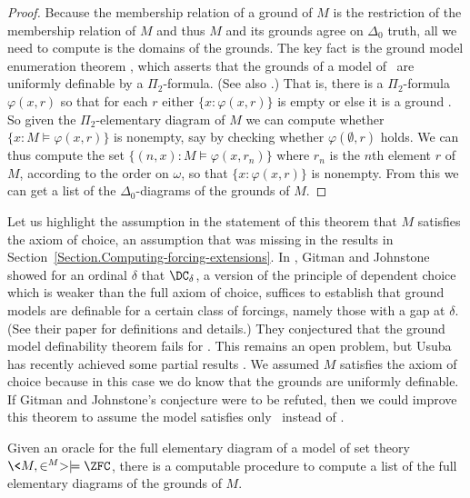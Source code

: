 \documentclass{amsart}
\begin{document}
 \begin{proof}
 Because the membership relation of a ground of $M$ is the restriction of the membership relation of $M$ and thus $M$ and its grounds agree on $\Delta_0$ truth, all we need to compute is the domains of the grounds.
 The key fact is the ground model enumeration theorem \cite{FuchsHamkinsReitz2015:Set-theoreticGeology}, which asserts that the grounds of a model of \ZFC\ are uniformly definable by a $\Pi_2$-formula. (See also \cite{BagariaHamkinsTsaprounisUsuba2016:SuperstrongAndOtherLargeCardinalsAreNeverLaverIndestructible}.) That is, there is a $\Pi_2$-formula $\varphi(x,r)$ so that for each $r$ either $\{ x : \varphi(x,r) \}$ is empty or else it is a ground \cite{FuchsHamkinsReitz2015:Set-theoreticGeology}.
 So given the $\Pi_2$-elementary diagram of $M$ we can compute whether $\{ x : M \models \varphi(x,r) \}$ is nonempty, say by checking whether $\varphi(\emptyset,r)$ holds. We can thus compute the set $\{ (n,x) : M \models \varphi(x,r_n) \}$ where $r_n$ is the $n$th element $r$ of $M$, according to the order on $\omega$, so that $\{ x : \varphi(x,r) \}$ is nonempty. From this we can get a list of the $\Delta_0$-diagrams of the grounds of $M$.
 \end{proof}
 
 Let us highlight the assumption in the statement of this theorem that $M$ satisfies the axiom of choice, an assumption that was missing in the results in Section~\ref{Section.Computing-forcing-extensions}. In \cite{gitmanjohnstone:groundmodels}, Gitman and Johnstone showed for an ordinal $\delta$ that $\DC_\delta$, a version of the principle of dependent choice which is weaker than the full axiom of choice, suffices to establish that ground models are definable for a certain class of forcings, namely those with a gap at $\delta$. (See their paper for definitions and details.) They conjectured that the ground model definability theorem fails for \ZF. This remains an open problem, but Usuba has recently achieved some partial results \cite{usuba2019}. We assumed $M$ satisfies the axiom of choice because in this case we do know that the grounds are uniformly definable. If Gitman and Johnstone's conjecture were to be refuted, then we could improve this theorem to assume the model satisfies only \ZF\ instead of \ZFC.
 
 \begin{corollary}\label{Corollary.Computing-grounds}
 Given an oracle for the full elementary diagram of a model of set theory $\<M,\in^M> \models \ZFC$, there is a computable procedure to compute a list of the full elementary diagrams of the grounds of $M$.
 \end{corollary}
 
\end{document}
